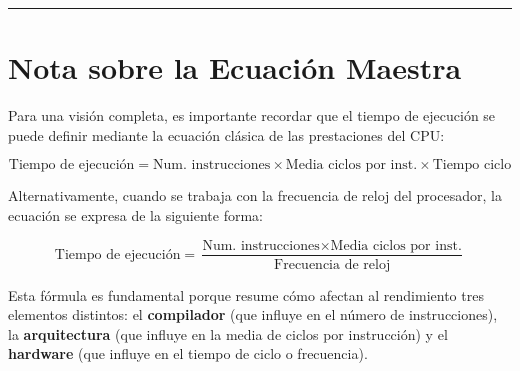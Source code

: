 \documentclass[12pt]{article}
\begin{document}
\vspace{0.5cm}
\hrule
\vspace{0.5cm}

\section*{Nota sobre la Ecuación Maestra}
Para una visión completa, es importante recordar que el tiempo de ejecución se puede definir mediante la ecuación clásica de las prestaciones del CPU:

\begin{tcolorbox}[cajaformal]
\[ \text{Tiempo de ejecución} = \text{Num. instrucciones} \times \text{Media ciclos por inst.} \times \text{Tiempo ciclo} \]
\end{tcolorbox}

Alternativamente, cuando se trabaja con la frecuencia de reloj del procesador, la ecuación se expresa de la siguiente forma:

\begin{tcolorbox}[cajaformal]
\[ \text{Tiempo de ejecución} = \frac{\text{Num. instrucciones} \times \text{Media ciclos por inst.}}{\text{Frecuencia de reloj}} \]
\end{tcolorbox}

Esta fórmula es fundamental porque resume cómo afectan al rendimiento tres elementos distintos: el \textbf{compilador} (que influye en el número de instrucciones), la \textbf{arquitectura} (que influye en la media de ciclos por instrucción) y el \textbf{hardware} (que influye en el tiempo de ciclo o frecuencia).
\end{document}
